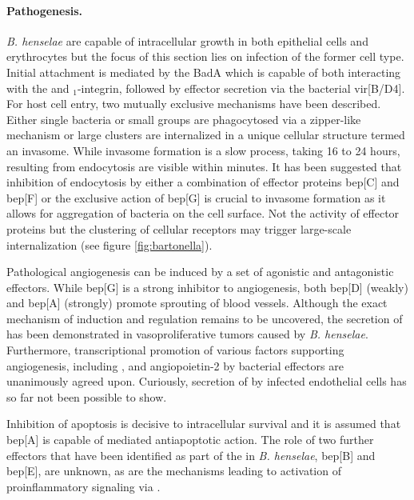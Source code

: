 \paragraph{Pathogenesis.}
\textit{B. henselae} are capable of intracellular growth in both epithelial cells and erythrocytes but the focus of this section lies on infection of the former cell type. Initial attachment is mediated by the  BadA which is capable of both interacting with the  and \textbeta$_1$-integrin, followed by effector secretion via the bacterial  \acrshort{vir}[B\slash D4]. For host cell entry, two mutually exclusive mechanisms have been described. Either single bacteria or small groups are phagocytosed via a zipper-like mechanism or large clusters are internalized in a unique cellular structure termed an invasome. While invasome formation is a slow process, taking 16 to 24 hours,  resulting from endocytosis are visible within minutes. It has been suggested that inhibition of endocytosis by either a combination of effector proteins \acrshort{bep}[C] and \acrshort{bep}[F] or the exclusive action of \acrshort{bep}[G] is crucial to invasome formation as it allows for aggregation of bacteria on the cell surface. Not the activity of effector proteins but the clustering of cellular receptors may trigger large-scale internalization (see figure \ref{fig:bartonella}).

Pathological angiogenesis can be induced by a set of agonistic and antagonistic effectors. While \acrshort{bep}[G] is a strong inhibitor to angiogenesis, both \acrshort{bep}[D] (weakly) and \acrshort{bep}[A] (strongly) promote sprouting of blood vessels. Although the exact mechanism of induction and regulation remains to be uncovered, the secretion of  has been demonstrated in vasoproliferative tumors caused by \textit{B. henselae}. Furthermore, transcriptional promotion of various factors supporting angiogenesis, including ,  and angiopoietin-2 by bacterial effectors are unanimously agreed upon. Curiously, secretion of  by infected endothelial cells has so far not been possible to show.

Inhibition of apoptosis is decisive to intracellular survival and it is assumed that \acrshort{bep}[A] is capable of  mediated antiapoptotic action. The role of two further effectors that have been identified as part of the  in \textit{B. henselae}, \acrshort{bep}[B] and \acrshort{bep}[E], are unknown, as are the mechanisms leading to activation of proinflammatory signaling via .

